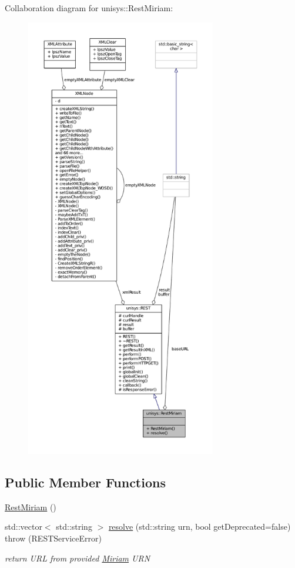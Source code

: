 Collaboration diagram for unisys\-:\-:Rest\-Miriam\-:
\nopagebreak
\begin{figure}[H]
\begin{center}
\leavevmode
\includegraphics[height=550pt]{classunisys_1_1RestMiriam__coll__graph}
\end{center}
\end{figure}
\subsection*{Public Member Functions}
\begin{DoxyCompactItemize}
\item 
\hyperlink{classunisys_1_1RestMiriam_aa4f3f5074e8aa37bd3eb334b7381fd19}{Rest\-Miriam} ()
\item 
std\-::vector$<$ std\-::string $>$ \hyperlink{classunisys_1_1RestMiriam_a02bf506a76e212f373644c991edf48de}{resolve} (std\-::string urn, bool get\-Deprecated=false)  throw (\-R\-E\-S\-T\-Service\-Error)
\begin{DoxyCompactList}\small\item\em return U\-R\-L from provided \hyperlink{classunisys_1_1Miriam}{Miriam} U\-R\-N \end{DoxyCompactList}\end{DoxyCompactItemize}
